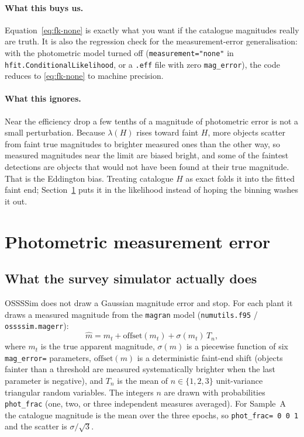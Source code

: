 \documentclass[11pt,a4paper]{article}
\begin{document}
\paragraph{What this buys us.}
Equation~\eqref{eq:fk-none} is exactly what you want if the catalogue
magnitudes really are truth.  It is also the regression check for the
measurement-error generalisation: with the photometric model turned off
(\texttt{measurement="none"} in \texttt{hfit.ConditionalLikelihood}, or a
\texttt{.eff} file with zero \texttt{mag\_error}), the code reduces to
\eqref{eq:fk-none} to machine precision.

\paragraph{What this ignores.}
Near the efficiency drop a few tenths of a magnitude of photometric error is
not a small perturbation.  Because $\lambda(H)$ rises toward faint $H$, more
objects scatter from faint true magnitudes to brighter measured ones than the
other way, so measured magnitudes near the limit are biased bright, and some
of the faintest detections are objects that would not have been found at
their true magnitude.  That is the Eddington bias.  Treating catalogue $H$ as
exact folds it into the fitted faint end; Section~\ref{sec:phot} puts it in
the likelihood instead of hoping the binning washes it out.

\section{Photometric measurement error}
\label{sec:phot}

\subsection{What the survey simulator actually does}

OSSSSim does not draw a Gaussian magnitude error and stop.  For each plant it
draws a measured magnitude from the \texttt{magran} model
(\texttt{numutils.f95} / \texttt{ossssim.magerr}):
\begin{equation}
  \hat m = m_t + \mathrm{offset}(m_t) + \sigma(m_t)\,T_n,
  \label{eq:magran}
\end{equation}
where $m_t$ is the true apparent magnitude,
$\sigma(m)$ is a piecewise function of six \texttt{mag\_error=} parameters,
$\mathrm{offset}(m)$ is a deterministic faint-end shift (objects fainter than
a threshold are measured systematically brighter when the last parameter is
negative), and $T_n$ is the mean of $n\in\{1,2,3\}$ unit-variance triangular
random variables.  The integers $n$ are drawn with probabilities
\texttt{phot\_frac} (one, two, or three independent measures averaged).  For
Sample~A the catalogue magnitude is the mean over the three epochs, so
\texttt{phot\_frac= 0 0 1} and the scatter is $\sigma/\sqrt3$.
\end{document}
